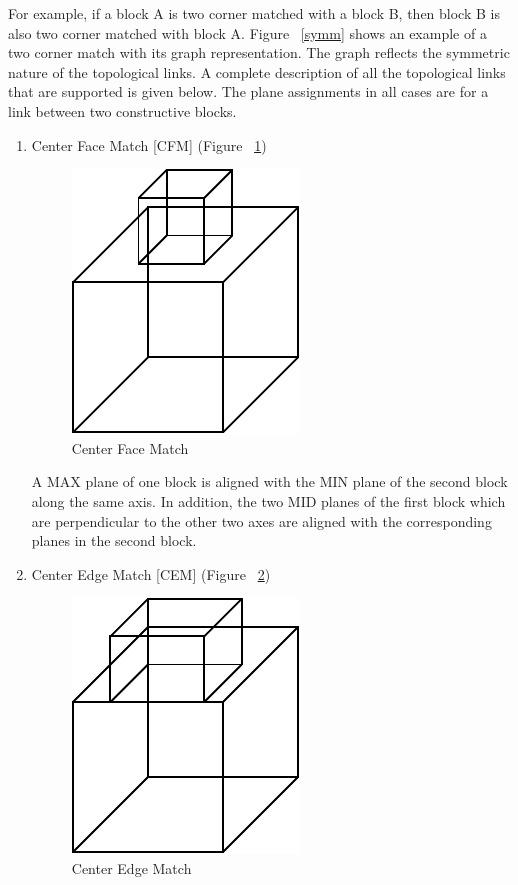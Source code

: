         For example, if a block A
        is two corner matched with a block B, then block B is also two corner
        matched with block A. Figure ~\ref{symm} shows an example of a two 
		corner
        match with its graph representation. The graph reflects the symmetric
        nature of the topological links. A complete description of all the
		topological links that are supported is given below. The plane
		assignments in all cases are for a link between two constructive blocks.

	\begin{enumerate}

	\item
	Center Face Match [CFM] (Figure ~\ref{cfm})

        \begin{figure}[htbp]
	\hspace{4cm}
	\includegraphics{CFM.pdf}
	\caption{Center Face Match}
            \label{cfm}
        \end{figure}
 
		A MAX plane of one block is aligned with the MIN plane of the second 
		block along the same axis. In addition, the two MID planes of the 
		first block which are perpendicular to the other two axes are aligned 
		with the corresponding planes in the second block.

	\item
	Center Edge Match [CEM] (Figure ~\ref{cem})

        \begin{figure}[htbp]
	\hspace{4cm}
	\includegraphics{CEM.pdf}
	\caption{Center Edge Match}
            \label{cem}
        \end{figure}
 

\end{enumerate}
